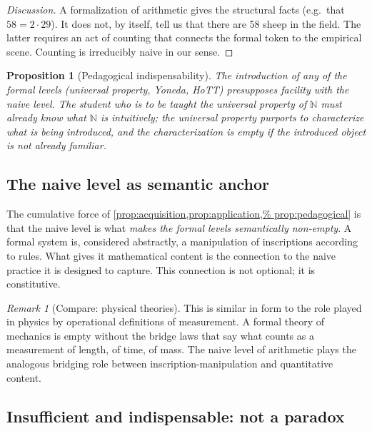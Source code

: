 \documentclass[12pt]{article}
\newtheorem{proposition}[theorem]{Proposition}
\theoremstyle{definition}
\theoremstyle{remark}
\newtheorem{remark}[theorem]{Remark}
\begin{document}
\begin{proof}[Discussion]
A formalization of arithmetic gives the structural facts (e.g.\ that
$58 = 2 \cdot 29$). It does not, by itself, tell us that there are 58
sheep in the field. The latter requires an act of counting that connects
the formal token to the empirical scene. Counting is irreducibly naive
in our sense.
\end{proof}

\begin{proposition}[Pedagogical indispensability]
\label{prop:pedagogical}
The introduction of any of the formal levels (universal property,
Yoneda, HoTT) presupposes facility with the naive level. The student
who is to be taught the universal property of $\mathbb{N}$ must already
know what $\mathbb{N}$ \emph{is intuitively}; the universal property
purports to characterize what is being introduced, and the
characterization is empty if the introduced object is not already
familiar.
\end{proposition}

\subsection{The naive level as semantic anchor}

The cumulative force of \cref{prop:acquisition,prop:application,%
prop:pedagogical} is that the naive level is what \emph{makes the formal
levels semantically non-empty}. A formal system is, considered abstractly,
a manipulation of inscriptions according to rules. What gives it
mathematical content is the connection to the naive practice it is
designed to capture. This connection is not optional; it is constitutive.

\begin{remark}[Compare: physical theories]
\label{rem:physics-compare}
This is similar in form to the role played in physics by operational
definitions of measurement. A formal theory of mechanics is empty
without the bridge laws that say what counts as a measurement of length,
of time, of mass. The naive level of arithmetic plays the analogous
bridging role between inscription-manipulation and quantitative content.
\end{remark}

\subsection{Insufficient and indispensable: not a paradox}
\end{document}
